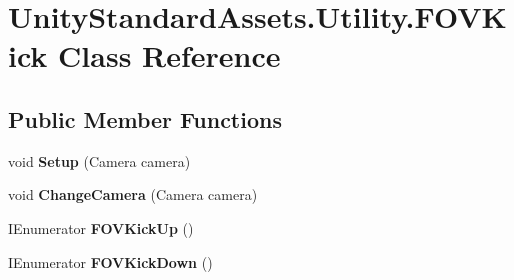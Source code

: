\hypertarget{class_unity_standard_assets_1_1_utility_1_1_f_o_v_kick}{}\section{Unity\+Standard\+Assets.\+Utility.\+F\+O\+V\+Kick Class Reference}
\label{class_unity_standard_assets_1_1_utility_1_1_f_o_v_kick}
\subsection*{Public Member Functions}
\begin{DoxyCompactItemize}
\item 
void {\bfseries Setup} (Camera camera)\hypertarget{class_unity_standard_assets_1_1_utility_1_1_f_o_v_kick_a26b683b3b8e10bcb541c77743e2cc199}{}\label{class_unity_standard_assets_1_1_utility_1_1_f_o_v_kick_a26b683b3b8e10bcb541c77743e2cc199}

\item 
void {\bfseries Change\+Camera} (Camera camera)\hypertarget{class_unity_standard_assets_1_1_utility_1_1_f_o_v_kick_af766e2f62e847c9e3e0a62bb9ea0b6ae}{}\label{class_unity_standard_assets_1_1_utility_1_1_f_o_v_kick_af766e2f62e847c9e3e0a62bb9ea0b6ae}

\item 
I\+Enumerator {\bfseries F\+O\+V\+Kick\+Up} ()\hypertarget{class_unity_standard_assets_1_1_utility_1_1_f_o_v_kick_abb86a74e68394ce9cdeff6864d30009f}{}\label{class_unity_standard_assets_1_1_utility_1_1_f_o_v_kick_abb86a74e68394ce9cdeff6864d30009f}

\item 
I\+Enumerator {\bfseries F\+O\+V\+Kick\+Down} ()\hypertarget{class_unity_standard_assets_1_1_utility_1_1_f_o_v_kick_a1f286392456ee5b0a63f506c80f2e101}{}\label{class_unity_standard_assets_1_1_utility_1_1_f_o_v_kick_a1f286392456ee5b0a63f506c80f2e101}

\end{DoxyCompactItemize}
